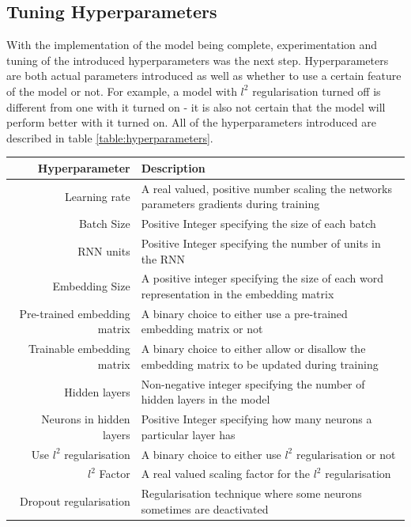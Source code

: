 \subsection{Tuning Hyperparameters}
With the implementation of the model being complete, experimentation and tuning of the introduced hyperparameters was the next step. Hyperparameters are both actual parameters introduced as well as whether to use a certain feature of the model or not. For example, a model with $l^2$ regularisation turned off is different from one with it turned on - it is also not certain that the model will perform better with it turned on. All of the hyperparameters introduced are described in table \ref{table:hyperparameters}.
\begin{table}[h!]
    \centering
    \begin{tabular}{ r  p{7cm} }
        \hline
        \textbf{Hyperparameter}  &  \textbf{Description} \\ \hline \hline
        Learning rate & A real valued, positive number scaling the networks parameters gradients during training  \\ \hline
        Batch Size & Positive Integer specifying the size of each batch \\ \hline
        RNN units & Positive Integer specifying the number of units in the RNN  \\ \hline
        Embedding Size & A positive integer specifying the size of each word representation in the embedding matrix \\ \hline
        Pre-trained embedding matrix & A binary choice to either use a pre-trained embedding matrix or not \\ \hline
        Trainable embedding matrix & A binary choice to either allow or disallow the embedding matrix to be updated during training \\ \hline
        Hidden layers & Non-negative integer specifying the number of hidden layers in the model \\ \hline
        Neurons in hidden layers & Positive Integer specifying how many neurons a particular layer has \\ \hline
        Use $l^2$ regularisation & A binary choice to either use $l^2$ regularisation or not \\ \hline
        $l^2$ Factor & A real valued scaling factor for the $l^2$ regularisation \\ \hline
        Dropout regularisation& Regularisation technique where some neurons sometimes are deactivated \\ \hline

\end{tabular}
\end{table}
